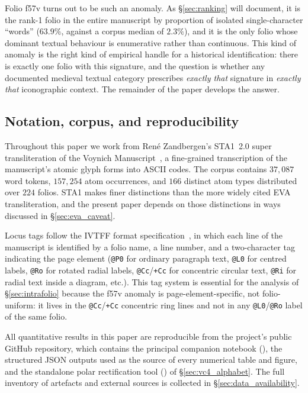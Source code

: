 Folio f57v turns out to be such an anomaly. As \S\ref{sec:ranking}
will document, it is the rank-1 folio in the entire manuscript by
proportion of isolated single-character ``words'' ($63.9\%$, against
a corpus median of $2.3\%$), and it is the only folio whose dominant
textual behaviour is enumerative rather than continuous. This kind of
anomaly is the right kind of empirical handle for a historical
identification: there is exactly one folio with this signature, and
the question is whether any documented medieval textual category
prescribes \emph{exactly that} signature in \emph{exactly that}
iconographic context. The remainder of the paper develops the answer.

\subsection{Notation, corpus, and reproducibility}
\label{sec:notation}

Throughout this paper we work from Ren\'e Zandbergen's STA1~2.0 super
transliteration of the Voynich Manuscript~\citep{zandbergen_sta1}, a
fine-grained transcription of the manuscript's atomic glyph forms
into ASCII codes. The corpus contains $37{,}087$ word tokens,
$157{,}254$ atom occurrences, and $166$ distinct atom types
distributed over $224$ folios. STA1 makes finer distinctions than the
more widely cited EVA transliteration, and the present paper depends
on those distinctions in ways discussed in \S\ref{sec:eva_caveat}.

Locus tags follow the IVTFF format
specification~\citep{zandbergen_ivtff}, in which each line of the
manuscript is identified by a folio name, a line number, and a
two-character tag indicating the page element (\texttt{@P0} for
ordinary paragraph text, \texttt{@L0} for centred labels, \texttt{@Ro}
for rotated radial labels, \texttt{@Cc}/\texttt{+Cc} for concentric
circular text, \texttt{@Ri} for radial text inside a diagram, etc.).
This tag system is essential for the analysis of \S\ref{sec:intrafolio}
because the f57v anomaly is page-element-specific, not folio-uniform:
it lives in the \texttt{@Cc}/\texttt{+Cc} concentric ring lines and
not in any \texttt{@L0}/\texttt{@Ro} label of the same folio.

All quantitative results in this paper are reproducible from the
project's public GitHub repository, which contains the principal
companion notebook (),
the structured JSON outputs used as the source of every numerical
table and figure, and the standalone polar rectification tool
() of
\S\ref{sec:vc4_alphabet}. The full inventory of artefacts and
external sources is collected in \S\ref{sec:data_availability}.


